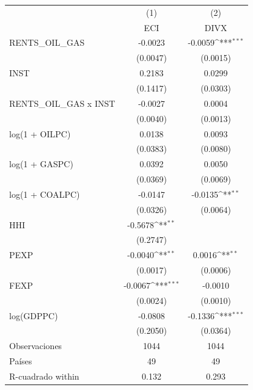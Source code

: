 {
\def\sym#1{\ifmmode^{#1}\else\(^{#1}\)\fi}
\begin{tabular}{l*{2}{c}}
\toprule
                    &\multicolumn{1}{c}{(1)}&\multicolumn{1}{c}{(2)}\\
                    &\multicolumn{1}{c}{ECI}&\multicolumn{1}{c}{DIVX}\\
\midrule
RENTS\_OIL\_GAS       &     -0.0023         &     -0.0059\sym{***}\\
                    &    (0.0047)         &    (0.0015)         \\
\addlinespace
INST                &      0.2183         &      0.0299         \\
                    &    (0.1417)         &    (0.0303)         \\
\addlinespace
RENTS\_OIL\_GAS x INST&     -0.0027         &      0.0004         \\
                    &    (0.0040)         &    (0.0013)         \\
\addlinespace
log(1 + OILPC)      &      0.0138         &      0.0093         \\
                    &    (0.0383)         &    (0.0080)         \\
\addlinespace
log(1 + GASPC)      &      0.0392         &      0.0050         \\
                    &    (0.0369)         &    (0.0069)         \\
\addlinespace
log(1 + COALPC)     &     -0.0147         &     -0.0135\sym{**} \\
                    &    (0.0326)         &    (0.0064)         \\
\addlinespace
HHI                 &     -0.5678\sym{**} &                     \\
                    &    (0.2747)         &                     \\
\addlinespace
PEXP                &     -0.0040\sym{**} &      0.0016\sym{**} \\
                    &    (0.0017)         &    (0.0006)         \\
\addlinespace
FEXP                &     -0.0067\sym{***}&     -0.0010         \\
                    &    (0.0024)         &    (0.0010)         \\
\addlinespace
log(GDPPC)          &     -0.0808         &     -0.1336\sym{***}\\
                    &    (0.2050)         &    (0.0364)         \\
\midrule
Observaciones       &        1044         &        1044         \\
Países              &          49         &          49         \\
R-cuadrado within   &       0.132         &       0.293         \\
\bottomrule
\end{tabular}
}
